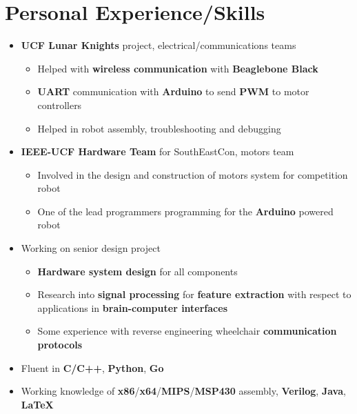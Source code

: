 \documentclass{my_resume}
\begin{document}
\section{Personal Experience/Skills}
\begin{itemize}
    \item \textbf{UCF Lunar Knights} project, electrical/communications teams
        \begin{itemize}
            \item Helped with \textbf{wireless communication} with
                \textbf{Beaglebone Black}
            \item \textbf{UART} communication with \textbf{Arduino} to send
                \textbf{PWM} to motor controllers
            \item Helped in robot assembly, troubleshooting and debugging
        \end{itemize}
    \item \textbf{IEEE-UCF Hardware Team} for SouthEastCon, motors team
        \begin{itemize}
            \item Involved in the design and construction of motors system for
                competition robot
            \item One of the lead programmers programming for the \textbf{Arduino}
                powered robot
        \end{itemize}
    \item Working on senior design project
        \begin{itemize}
            \item \textbf{Hardware system design} for all components
            \item Research into \textbf{signal processing} for \textbf{feature extraction}
                with respect to applications in \textbf{brain-computer interfaces}
            \item Some experience with reverse engineering wheelchair 
                \textbf{communication protocols}
        \end{itemize}
	\item Fluent in \textbf{C/C++}, \textbf{Python}, \textbf{Go}
	\item Working knowledge of \textbf{x86}/\textbf{x64}/\textbf{MIPS}/\textbf{MSP430} assembly,
		\textbf{Verilog}, \textbf{Java}, \textbf{LaTeX}
\end{itemize}
\end{document}
